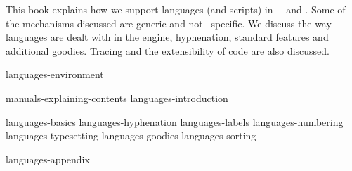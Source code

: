 
%
%

\enablemode[simple] %

\startbuffer[abstract]

    This book explains how we support languages (and scripts) in \CONTEXT\ \MKIV\
    and \LUATEX. Some of the mechanisms discussed are generic and not \CONTEXT\
    specific. We discuss the way languages are dealt with in the engine,
    hyphenation, standard features and additional goodies. Tracing and the
    extensibility of code are also discussed.

\stopbuffer

\environment languages-environment

\startdocument
  [author=Hans Hagen,
   title=Languages in \ConTeXt,
   subtitle=explaining luatex and mkiv,
   affiliation=PRAGMA ADE,
   comment=work in progress,
   cover:color:1=darkmagenta,
   cover:color:2=darkorange,
   cover:color:3=darkyellow,
   cover:color:4=darkcyan,
   cover:color:5=darkgray]

    \startfrontmatter
        \component manuals-explaining-contents
        \component languages-introduction
    \stopfrontmatter

    \startbodymatter
        \component languages-basics
        \component languages-hyphenation
        \component languages-labels
        \component languages-numbering
        \component languages-typesetting
        \component languages-goodies
        \component languages-sorting
    \stopbodymatter

    \startappendices
        \component languages-appendix
    \stopappendices

\stopdocument
